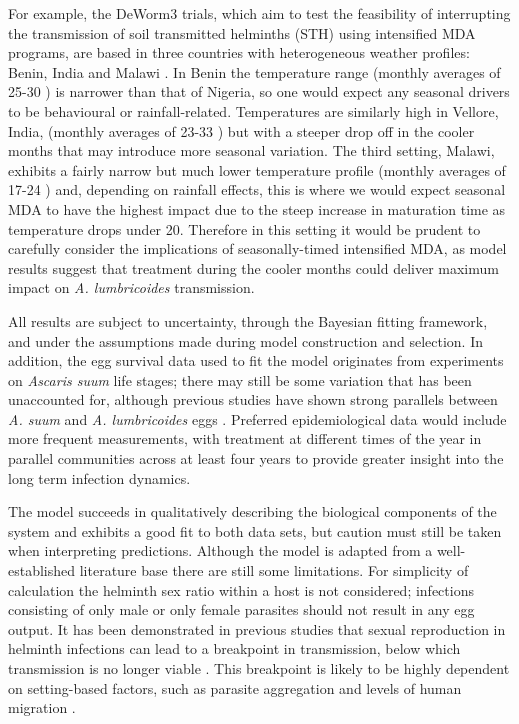 For example, the DeWorm3 trials, which aim to test the feasibility of interrupting the transmission of soil transmitted helminths (STH) using intensified MDA programs, are based in three countries with heterogeneous weather profiles: Benin, India and Malawi \cite{Deworm3}. In Benin the temperature range (monthly averages of 25-30 \cite{TempB}) is narrower than that of Nigeria, so one would expect any seasonal drivers to be behavioural or rainfall-related. Temperatures are similarly high in Vellore, India, (monthly averages of 23-33 \cite{TempV}) but with a steeper drop off in the cooler months that may introduce more seasonal variation. The third setting, Malawi, exhibits a fairly narrow but much lower temperature profile (monthly averages of 17-24 \cite{TempM}) and, depending on rainfall effects, this is where we would expect seasonal MDA to have the highest impact due to the steep increase in maturation time as temperature drops under 20. Therefore in this setting it would be prudent to carefully consider the implications of seasonally-timed intensified MDA, as model results suggest that treatment during the cooler months could deliver maximum impact on \textit{A. lumbricoides} transmission.

All results are subject to uncertainty, through the Bayesian fitting framework, and under the assumptions made during model construction and selection. In addition, the egg survival data used to fit the model originates from experiments on \textit{Ascaris suum} life stages; there may still be some variation that has been unaccounted for, although previous studies have shown strong parallels between \textit{A. suum} and \textit{A. lumbricoides} eggs \cite{Boes}. Preferred epidemiological data would include more frequent measurements, with treatment at different times of the year in parallel communities across at least four years to provide greater insight into the long term infection dynamics. 

The model succeeds in qualitatively describing the biological components of the system and exhibits a good fit to both data sets, but caution must still be taken when interpreting predictions. Although the model is adapted from a well-established literature base there are still some limitations. For simplicity of calculation the helminth sex ratio within a host is not considered; infections consisting of only male or only female parasites should not result in any egg output. It has been demonstrated in previous studies that sexual reproduction in helminth infections can lead to a breakpoint in transmission, below which transmission is no longer viable \cite{Anderson1992,Anderson2017}. This breakpoint is likely to be highly dependent on setting-based factors, such as parasite aggregation and levels of human migration \cite{Hardwick2019}.

